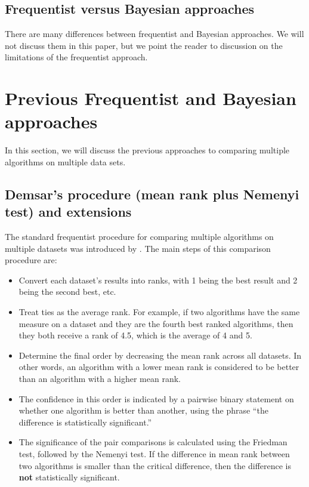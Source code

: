 \documentclass[twoside,11pt,preprint]{article}
\begin{document}
\hypertarget{frequentist-versus-bayesian-approaches}{%
\subsection{Frequentist versus Bayesian approaches}\label{frequentist-versus-bayesian-approaches}}

There are many differences between frequentist and Bayesian
approaches. We will not discuss them in this paper, but we point the
reader to \citet{benavoli2017time} discussion on the limitations of the
frequentist approach.

\hypertarget{previous-frequentist-and-bayesian-approaches}{%
\section{\texorpdfstring{Previous Frequentist and Bayesian approaches \label{sec:prev}}{Previous Frequentist and Bayesian approaches }}\label{previous-frequentist-and-bayesian-approaches}}

In this section, we will discuss the previous approaches to comparing multiple algorithms on multiple data sets.

\hypertarget{demsars-procedure-mean-rank-plus-nemenyi-test-and-extensions}{%
\subsection{\texorpdfstring{Demsar's procedure (mean rank plus Nemenyi test) and extensions \label{sec:demsar}}{Demsar's procedure (mean rank plus Nemenyi test) and extensions }}\label{demsars-procedure-mean-rank-plus-nemenyi-test-and-extensions}}

The standard frequentist procedure for comparing multiple algorithms on multiple datasets was introduced by \citet{demsar}. The main steps of this comparison procedure are:

\begin{itemize}
\item
  Convert each dataset's results into ranks, with 1 being the best result and 2 being the second best, etc.
\item
  Treat ties as the average rank. For example, if two algorithms have the same measure on a dataset and they are the fourth best ranked algorithms, then they both receive a rank of 4.5, which is the average of 4 and 5.
\item
  Determine the final order by decreasing the mean rank across all datasets. In other words, an algorithm with a lower mean rank is considered to be better than an algorithm with a higher mean rank.
\item
  The confidence in this order is indicated by a pairwise binary statement on whether one algorithm is better than another, using the phrase ``the difference is statistically significant.''
\item
  The significance of the pair comparisons is calculated using the Friedman test, followed by the Nemenyi test. If the difference in mean rank between two algorithms is smaller than the critical difference, then the difference is \textbf{not} statistically significant.
\end{itemize}
\end{document}

